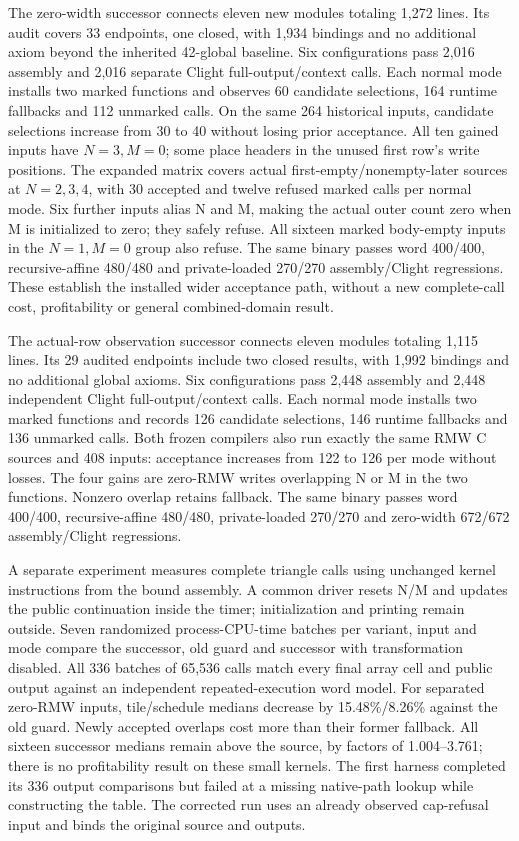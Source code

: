 The zero-width successor connects eleven new modules totaling 1,272 lines.
Its audit covers 33 endpoints, one closed, with 1,934 bindings and no additional
axiom beyond the inherited 42-global baseline. Six configurations pass 2,016
assembly and 2,016 separate Clight full-output/context calls. Each normal mode
installs two marked functions and observes 60 candidate selections, 164 runtime
fallbacks and 112 unmarked calls. On the same 264 historical inputs, candidate
selections increase from 30 to 40 without losing prior acceptance. All ten
gained inputs have $N=3,M=0$; some place headers in the unused first row's
write positions. The expanded matrix covers actual first-empty/nonempty-later
sources at $N=2,3,4$, with 30 accepted and twelve refused marked calls per
normal mode. Six further inputs alias N and M, making the actual outer count
zero when M is initialized to zero; they safely refuse. All sixteen marked
body-empty inputs in the $N=1,M=0$ group also refuse. The same binary passes
word 400/400, recursive-affine 480/480 and private-loaded 270/270
assembly/Clight regressions. These establish the installed wider acceptance
path, without a new complete-call cost, profitability or general combined-domain
result.

The actual-row observation successor connects eleven modules totaling 1,115
lines. Its 29 audited endpoints include two closed results, with 1,992 bindings
and no additional global axioms. Six configurations pass 2,448 assembly and
2,448 independent Clight full-output/context calls. Each normal mode installs
two marked functions and records 126 candidate selections, 146 runtime
fallbacks and 136 unmarked calls. Both frozen compilers also run exactly the
same RMW C sources and 408 inputs: acceptance increases from 122 to 126 per
mode without losses. The four gains are zero-RMW writes overlapping N or M
in the two functions. Nonzero overlap retains fallback. The same binary passes
word 400/400, recursive-affine 480/480, private-loaded 270/270 and zero-width
672/672 assembly/Clight regressions.

A separate experiment measures complete triangle calls using unchanged kernel
instructions from the bound assembly. A common driver resets N/M and updates
the public continuation inside the timer; initialization and printing remain
outside. Seven randomized process-CPU-time batches per variant, input and
mode compare the successor, old guard and successor with transformation
disabled. All 336 batches of 65,536 calls match every final array cell and public
output against an independent repeated-execution word model. For separated
zero-RMW inputs, tile/schedule medians decrease by 15.48\%/8.26\% against the
old guard. Newly accepted overlaps cost more than their former fallback.
All sixteen successor medians remain above the source, by factors of
1.004--3.761; there is no profitability result on these small kernels. The
first harness completed its 336 output comparisons but failed at a missing
native-path lookup while constructing the table. The corrected run uses an
already observed cap-refusal input and binds the original source and outputs.

